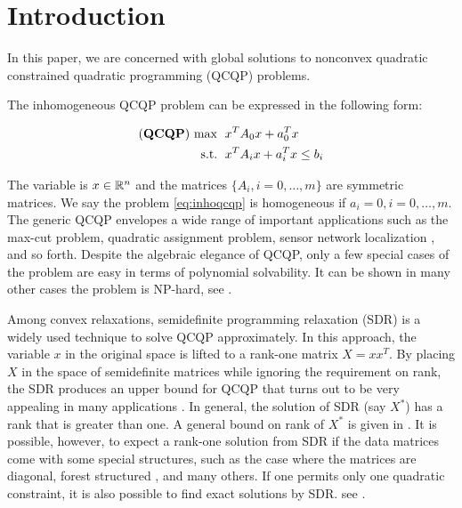\documentclass[../main]{subfiles}
\begin{document}
\section{Introduction}
In this paper, we are concerned with global solutions to nonconvex quadratic constrained quadratic programming (QCQP) problems.


The inhomogeneous QCQP problem can be expressed in the following form:

\begin{equation}
      \label{eq:inhoqcqp}
      \begin{aligned}
            (\textbf{QCQP}) ~\mathbf{\max}\;~ & x^T A_0 x + a_0^T x         \\
            \mathrm{s.t.\;} ~              & x^T A_i x + a_i^T x \le b_i \\
      \end{aligned}
\end{equation}

The variable is \(x \in \mathbb{R}^n\) and the matrices \(\{A_i, i=0,\ldots, m\}\) are symmetric matrices. We say the problem \eqref{eq:inhoqcqp} is homogeneous if \(a_i = 0, i=0,\ldots, m\). The generic QCQP envelopes a wide range of important applications such as the max-cut problem, quadratic assignment problem, sensor network localization \cite{biswas_semidefinite_2004}, and so forth. Despite the algebraic elegance of QCQP, only a few special cases of the problem are easy in terms of polynomial solvability. It can be shown in many other cases the problem is NP-hard, see \cite[]{pardalos_quadratic_1991, ...}.

Among convex relaxations, semidefinite programming relaxation (SDR) is a widely used technique to solve QCQP approximately. In this approach, the variable \(x\) in the original space is lifted to a rank-one matrix \(X = xx^T\). By placing \(X\) in the space of semidefinite matrices while ignoring the requirement on rank, the SDR produces an upper bound for QCQP that turns out to be very appealing in many applications \cite[]{biswas_semidefinite_2004,biswas_semidefinite_2006}. In general, the solution of SDR (say \(X^*\)) has a rank that is greater than one. A general bound on rank of \(X^*\) is given in \cite[]{pataki, }. It is possible, however, to expect a rank-one solution from SDR if the data matrices come with some special structures, such as the case where the matrices are diagonal\cite[]{burer_exact_2020}, forest structured \cite[]{azuma_exact_2021}, and many others.
If one permits only one quadratic constraint, it is also possible to find exact solutions by SDR. see \cite{sturm_cones_2003, ye_new_2003}.
\end{document}
